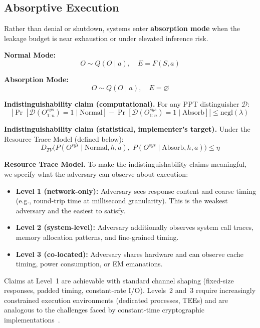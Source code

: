 \documentclass[11pt,a4paper]{article}
\begin{document}
\subsection{Absorptive Execution}\label{sec:absorptive}

Rather than denial or shutdown, systems enter \textbf{absorption mode} when the leakage budget is near exhaustion or under elevated inference risk.

\textbf{Normal Mode:}
\begin{equation}
O \sim Q(O \mid a), \quad E = F(S, a)
\end{equation}

\textbf{Absorption Mode:}
\begin{equation}
O \sim Q(O \mid a), \quad E = \varnothing
\end{equation}

\textbf{Indistinguishability claim (computational).} For any PPT distinguisher $\mathcal{D}$:
\begin{equation}
\left|\Pr[\mathcal{D}(O^{sys}_{1:n}) = 1 \mid \text{Normal}] - \Pr[\mathcal{D}(O^{sys}_{1:n}) = 1 \mid \text{Absorb}]\right| \le \text{negl}(\lambda)
\end{equation}

\textbf{Indistinguishability claim (statistical, implementer's target).} Under the Resource Trace Model (defined below):
\begin{equation}
D_{TV}\big(P(O^{sys} \mid \text{Normal}, h, a),\; P(O^{sys} \mid \text{Absorb}, h, a)\big) \le \eta
\end{equation}

\textbf{Resource Trace Model.} To make the indistinguishability claims meaningful, we specify what the adversary can observe about execution:

\begin{itemize}
  \item \textbf{Level 1 (network-only):} Adversary sees response content and coarse timing (e.g., round-trip time at millisecond granularity). This is the weakest adversary and the easiest to satisfy.
  \item \textbf{Level 2 (system-level):} Adversary additionally observes system call traces, memory allocation patterns, and fine-grained timing.
  \item \textbf{Level 3 (co-located):} Adversary shares hardware and can observe cache timing, power consumption, or EM emanations.
\end{itemize}

Claims at Level~1 are achievable with standard channel shaping (fixed-size responses, padded timing, constant-rate I/O). Levels~2 and~3 require increasingly constrained execution environments (dedicated processes, TEEs) and are analogous to the challenges faced by constant-time cryptographic implementations~\cite{bernstein2005cache, coppens2009practical}.
\end{document}
